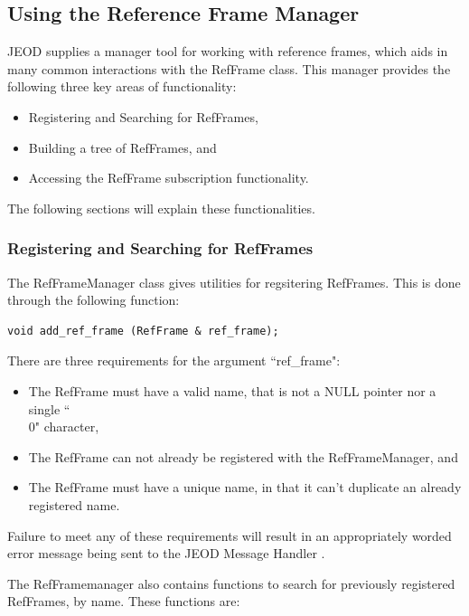 \subsection{Using the Reference Frame Manager}

JEOD supplies a manager tool for working with reference frames, which
aids in many common interactions with the RefFrame class. This
manager provides the following three key areas of functionality:

\begin{itemize}
\item{Registering and Searching for RefFrames},
\item{Building a tree of RefFrames, and}
\item{Accessing the RefFrame subscription functionality.}
\end{itemize}

The following sections will explain these functionalities.

\subsubsection{Registering and Searching for RefFrames}

The RefFrameManager class gives utilities for regsitering
RefFrames. This is done through the following function:

\begin{verbatim}
void add_ref_frame (RefFrame & ref_frame);
\end{verbatim}

There are three requirements for the argument ``ref\_frame":

\begin{itemize}
\item{The RefFrame must have a valid name, that is not a NULL pointer
nor a single ``\\0" character,}
\item{The RefFrame can not already be registered with the RefFrameManager, and}
\item{The RefFrame must have a unique name, in that it can't duplicate
an already registered name.}
\end{itemize}

Failure to meet any of these requirements will result in an appropriately
worded error message being sent to the JEOD Message Handler
\cite{dynenv:MESSAGE}.

The RefFramemanager also contains functions to search
for previously registered RefFrames, by name. These functions
are:

